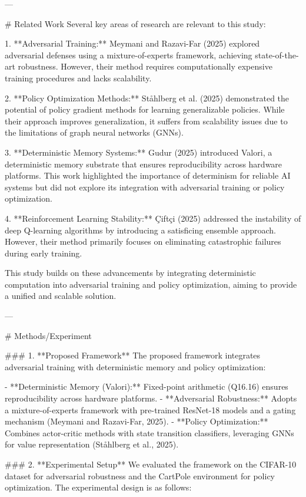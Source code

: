 ---

# Related Work  
Several key areas of research are relevant to this study:  

1. **Adversarial Training:** Meymani and Razavi-Far (2025) explored adversarial defenses using a mixture-of-experts framework, achieving state-of-the-art robustness. However, their method requires computationally expensive training procedures and lacks scalability.  

2. **Policy Optimization Methods:** Ståhlberg et al. (2025) demonstrated the potential of policy gradient methods for learning generalizable policies. While their approach improves generalization, it suffers from scalability issues due to the limitations of graph neural networks (GNNs).  

3. **Deterministic Memory Systems:** Gudur (2025) introduced Valori, a deterministic memory substrate that ensures reproducibility across hardware platforms. This work highlighted the importance of determinism for reliable AI systems but did not explore its integration with adversarial training or policy optimization.  

4. **Reinforcement Learning Stability:** Çiftçi (2025) addressed the instability of deep Q-learning algorithms by introducing a satisficing ensemble approach. However, their method primarily focuses on eliminating catastrophic failures during early training.  

This study builds on these advancements by integrating deterministic computation into adversarial training and policy optimization, aiming to provide a unified and scalable solution.

---

# Methods/Experiment  

### 1. **Proposed Framework**  
The proposed framework integrates adversarial training with deterministic memory and policy optimization:  

- **Deterministic Memory (Valori):** Fixed-point arithmetic (Q16.16) ensures reproducibility across hardware platforms.  
- **Adversarial Robustness:** Adopts a mixture-of-experts framework with pre-trained ResNet-18 models and a gating mechanism (Meymani and Razavi-Far, 2025).  
- **Policy Optimization:** Combines actor-critic methods with state transition classifiers, leveraging GNNs for value representation (Ståhlberg et al., 2025).  

### 2. **Experimental Setup**  
We evaluated the framework on the CIFAR-10 dataset for adversarial robustness and the CartPole environment for policy optimization. The experimental design is as follows:  

